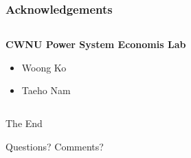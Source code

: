 \documentclass[
	11pt, %
	aspectratio=169, %
]{beamer}
\begin{document}

\begin{frame}
	\frametitle{Acknowledgements}
	
	\begin{columns}[t] %
		\begin{column}{0.45\textwidth} %
			\textbf{CWNU Power System Economis Lab}
			\begin{itemize}
				\item Woong Ko
				\item Taeho Nam
			\end{itemize}
			
		\end{column}		
		
	\end{columns}
\end{frame}


\begin{frame}[plain] %
	\begin{center}
		{\Huge The End}
		
		\bigskip\bigskip %
		
		{\LARGE Questions? Comments?}
	\end{center}
\end{frame}

\end{document}
